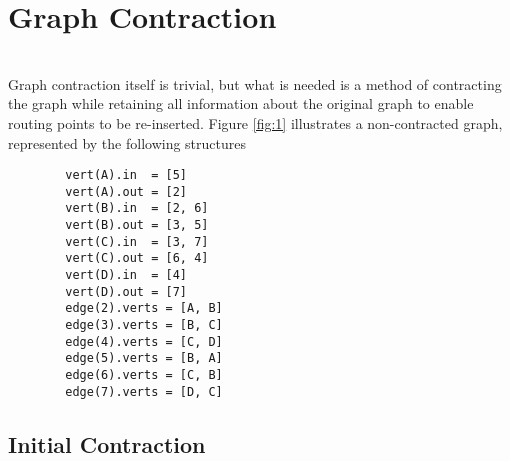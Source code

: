 \section{Graph Contraction}\\

    \noindent Graph contraction itself is trivial, but what is needed is a method of contracting the graph while retaining all information about
    the original graph to enable routing points to be re-inserted.  Figure \ref{fig:1} illustrates a non-contracted graph, represented by the
    following structures
    \begin{lstlisting}
        vert(A).in  = [5]
        vert(A).out = [2]
        vert(B).in  = [2, 6]
        vert(B).out = [3, 5]
        vert(C).in  = [3, 7]
        vert(C).out = [6, 4]
        vert(D).in  = [4]
        vert(D).out = [7]
        edge(2).verts = [A, B]
        edge(3).verts = [B, C]
        edge(4).verts = [C, D]
        edge(5).verts = [B, A]
        edge(6).verts = [C, B]
        edge(7).verts = [D, C]
    \end{lstlisting}

    

    \vspace{12pt}\subsection{Initial Contraction}

